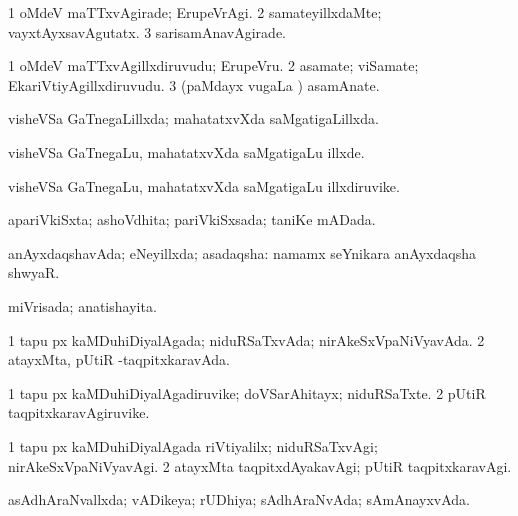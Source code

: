 {\bentry
{} 
\gl{\kirxvi}
\expl{}
\bmng
\bnum
\num{1} oMdeV maTTxvAgirade; ErupeVrAgi. 
\num{2} samateyillxdaMte; vayxtAyxsavAgutatx. 
\num{3} sarisamAnavAgirade. 
\enum
\emng
\eentry

\bentry
{} 
\gl{\nA}
\expl{}
\bmng
\bnum
\num{1} oMdeV maTTxvAgillxdiruvudu; ErupeVru. 
\num{2} asamate; viSamate; EkariVtiyAgillxdiruvudu. 
\num{3} (paMdayx \mo vugaLa \vi) asamAnate. 
\enum
\emng
\eentry

\bentry
{} 
\gl{\gu}
\expl{}
\bmng
 visheVSa GaTnegaLillxda; mahatatxvXda saMgatigaLillxda. 
\emng
\eentry

\bentry
{} 
\gl{\kirxvi}
\expl{}
\bmng
 visheVSa GaTnegaLu, mahatatxvXda saMgatigaLu illxde. 
\emng
\eentry

\bentry
{} 
\gl{\nA}
\expl{}
\bmng
 visheVSa GaTnegaLu, mahatatxvXda saMgatigaLu illxdiruvike. 
\emng
\eentry

\bentry
{} 
\gl{\gu}
\expl{}
\bmng
 apariVkiSxta; ashoVdhita; pariVkiSxsada; taniKe mADada. 
\emng
\eentry

\bentry
{} 
\gl{\gu}
\expl{}
\bmng
 anAyxdaqshavAda; eNeyillxda; asadaqsha:  namamx seYnikara anAyxdaqsha shwyaR. 
\emng
\eentry

\bentry
{} 
\gl{\gu}
\expl{}
\bmng
 miVrisada; anatishayita. 
\emng
\eentry

\bentry
{} 
\gl{\gu}
\expl{}
\bmng
\bnum
\num{1} tapu px kaMDuhiDiyalAgada; niduRSaTxvAda; nirAkeSxVpaNiVyavAda. 
\num{2} atayxMta, pUtiR -taqpitxkaravAda. 
\enum
\emng
\eentry

\bentry
{} 
\gl{\nA}
\expl{}
\bmng
\bnum
\num{1} tapu px kaMDuhiDiyalAgadiruvike; doVSarAhitayx; niduRSaTxte. 
\num{2} pUtiR taqpitxkaravAgiruvike. 
\enum
\emng
\eentry

\bentry
{} 
\gl{\kirxvi}
\expl{}
\bmng
\bnum
\num{1} tapu px kaMDuhiDiyalAgada riVtiyalilx; niduRSaTxvAgi; nirAkeSxVpaNiVyavAgi. 
\num{2} atayxMta taqpitxdAyakavAgi; pUtiR taqpitxkaravAgi. 
\enum
\emng
\eentry

\bentry
{} 
\gl{\gu}
\expl{}
\bmng
 asAdhAraNvallxda; vADikeya; rUDhiya; sAdhAraNvAda; sAmAnayxvAda. 
\emng
\eentry

}
